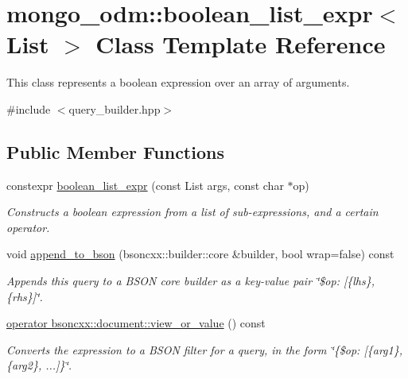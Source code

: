 \hypertarget{classmongo__odm_1_1boolean__list__expr}{}\section{mongo\+\_\+odm\+:\+:boolean\+\_\+list\+\_\+expr$<$ List $>$ Class Template Reference}
\label{classmongo__odm_1_1boolean__list__expr}


This class represents a boolean expression over an array of arguments.  




{\ttfamily \#include $<$query\+\_\+builder.\+hpp$>$}

\subsection*{Public Member Functions}
\begin{DoxyCompactItemize}
\item 
constexpr \hyperlink{classmongo__odm_1_1boolean__list__expr_a71f9da341b80a5bd5062c8ec627a9241}{boolean\+\_\+list\+\_\+expr} (const List args, const char $\ast$op)
\begin{DoxyCompactList}\small\item\em Constructs a boolean expression from a list of sub-\/expressions, and a certain operator. \end{DoxyCompactList}\item 
void \hyperlink{classmongo__odm_1_1boolean__list__expr_a5aa985b42f30ceb49fa6a5481693aa8a}{append\+\_\+to\+\_\+bson} (bsoncxx\+::builder\+::core \&builder, bool wrap=false) const 
\begin{DoxyCompactList}\small\item\em Appends this query to a B\+S\+ON core builder as a key-\/value pair \char`\"{}\$op\+: \mbox{[}\{lhs\}, \{rhs\}\mbox{]}\char`\"{}. \end{DoxyCompactList}\item 
\hyperlink{classmongo__odm_1_1boolean__list__expr_aec500b9de32ab2dbe8550aeccc1115ca}{operator bsoncxx\+::document\+::view\+\_\+or\+\_\+value} () const \hypertarget{classmongo__odm_1_1boolean__list__expr_aec500b9de32ab2dbe8550aeccc1115ca}{}\label{classmongo__odm_1_1boolean__list__expr_aec500b9de32ab2dbe8550aeccc1115ca}

\begin{DoxyCompactList}\small\item\em Converts the expression to a B\+S\+ON filter for a query, in the form \char`\"{}\{\$op\+: \mbox{[}\{arg1\}, \{arg2\}, ...\mbox{]}\}\char`\"{}. \end{DoxyCompactList}\end{DoxyCompactItemize}


